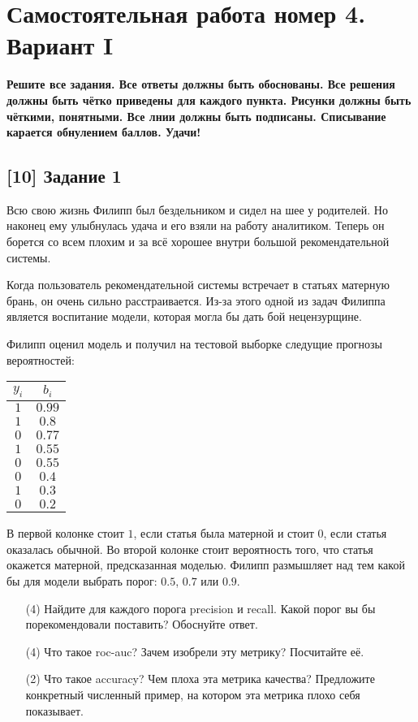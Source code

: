 \documentclass[12pt, a4paper, oneside]{article}
\begin{document}

\section*{Самостоятельная работа номер 4. Вариант I}

\textbf{Решите все задания. Все ответы должны быть обоснованы. Все решения должны быть чётко приведены для каждого пункта. Рисунки должны быть чёткими, понятными. Все лнии должны быть подписаны. Списывание карается обнулением баллов. Удачи!}

\subsection*{[10] Задание 1 }

Всю свою жизнь Филипп был бездельником и сидел на шее у родителей. Но наконец ему улыбнулась удача и его взяли на работу аналитиком. Теперь он борется со всем плохим и за всё хорошее внутри большой рекомендательной системы. 

Когда пользователь рекомендательной системы встречает в статьях матерную брань, он очень сильно расстраивается. Из-за этого одной из задач Филиппа является воспитание модели, которая могла бы дать бой нецензурщине. 

Филипп оценил модель и получил на тестовой выборке следущие прогнозы вероятностей: 

\begin{center}
	\begin{tabular}{c|c}
		$y_i$ & $b_i$ \\
		\hline
		$1$  & $0.99$ \\
		$1$ & $0.8$ \\
		$0$ & $0.77$ \\
		$1$ & $0.55$ \\
		$0$  & $0.55$ \\
		$0$ & $0.4$ \\
		$1$ & $0.3$ \\
		$0$ & $0.2$ \\
	\end{tabular}
\end{center}


В первой колонке стоит $1$, если статья была матерной и стоит $0$, если статья оказалась обычной. Во второй колонке стоит вероятность того, что статья окажется матерной, предсказанная моделью. Филипп размышляет над тем какой бы для модели выбрать порог: $0.5$, $0.7$ или $0.9$. 

\begin{enumerate}
	\item[(4)] Найдите для каждого порога precision и recall. Какой порог вы бы порекомендовали поставить? Обоснуйте ответ.
	
	\item[(4)] Что такое roc-auc? Зачем изобрели эту метрику? Посчитайте её.
	
	\item[(2)]  Что такое accuracy? Чем плоха эта метрика качества? Предложите конкретный численный пример, на котором эта метрика плохо себя показывает.
	
\end{enumerate}
\end{document}
